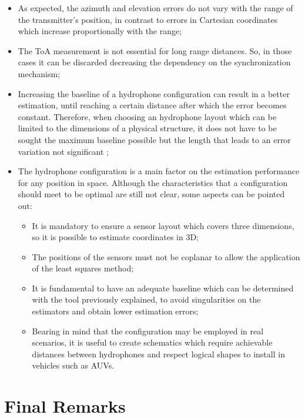 \begin{itemize}
	\item As expected, the azimuth and elevation errors do not vary with the range of the transmitter's position, in contrast to errors in Cartesian coordinates which increase proportionally with the range;
	
	\item The ToA measurement is not essential for long range distances. So, in those cases it can be discarded decreasing the dependency on the synchronization mechanism;
	
	\item Increasing the baseline of a hydrophone configuration can result in a better estimation, until reaching a certain distance after which the error becomes constant. Therefore, when choosing an hydrophone layout which can be limited to the dimensions of a physical structure, it does not have to be sought the maximum baseline possible but the length that leads to an error variation not significant ;
	
	\item The hydrophone configuration is a main factor on the estimation performance for any position in space. Although the characteristics that a configuration should meet to be optimal are still not clear, some aspects can be pointed out: 
	
	\begin{itemize}
		\item It is mandatory to ensure a sensor layout which covers three dimensions, so it is possible to estimate coordinates in 3D;
		\item The positions of the sensors must not be coplanar to allow the application of the least squares method;
		\item It is fundamental to have an adequate baseline which can be determined with the tool previously explained, to avoid singularities on the estimators and obtain lower estimation errors;
		\item Bearing in mind that the configuration may be employed in real scenarios, it is useful to create schematics which require achievable distances between hydrophones and respect logical shapes to install in vehicles such as AUVs.
	\end{itemize}
\end{itemize}

\section{Final Remarks}

